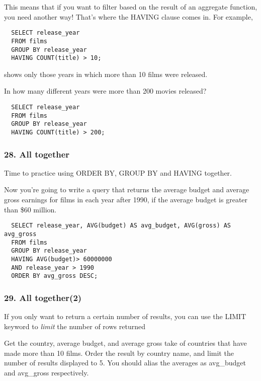 \documentclass[
]{article}
\begin{document}
This means that if you want to filter based on the result of an
aggregate function, you need another way! That's where the HAVING clause
comes in. For example,

\begin{verbatim}
  SELECT release_year
  FROM films
  GROUP BY release_year
  HAVING COUNT(title) > 10;
\end{verbatim}

shows only those years in which more than 10 films were released.

In how many different years were more than 200 movies released?

\begin{verbatim}
  SELECT release_year
  FROM films
  GROUP BY release_year
  HAVING COUNT(title) > 200;
\end{verbatim}

\hypertarget{all-together}{%
\subsubsection{28. All together}\label{all-together}}

Time to practice using ORDER BY, GROUP BY and HAVING together.

Now you're going to write a query that returns the average budget and
average gross earnings for films in each year after 1990, if the average
budget is greater than \$60 million.

\begin{verbatim}
  SELECT release_year, AVG(budget) AS avg_budget, AVG(gross) AS avg_gross
  FROM films
  GROUP BY release_year
  HAVING AVG(budget)> 60000000
  AND release_year > 1990
  ORDER BY avg_gross DESC;
\end{verbatim}

\hypertarget{all-together2}{%
\subsubsection{29. All together(2)}\label{all-together2}}

If you only want to return a certain number of results, you can use the
LIMIT keyword to \emph{limit} the number of rows returned

Get the country, average budget, and average gross take of countries
that have made more than 10 films. Order the result by country name, and
limit the number of results displayed to 5. You should alias the
averages as avg\_budget and avg\_gross respectively.
\end{document}
